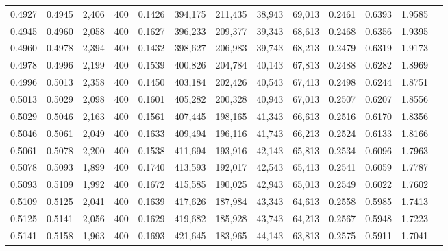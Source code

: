 \begin{tabular}{rrrrrrrrrrrrr}
0.4927 & 0.4945 &  2,406 & 400 &                                     0.1426 & 394,175 & 211,435 &  38,943 &  69,013 & 0.2461 & 0.6393 & 1.9585 \\
0.4945 & 0.4960 &  2,058 & 400 &                                     0.1627 & 396,233 & 209,377 &  39,343 &  68,613 & 0.2468 & 0.6356 & 1.9395 \\
0.4960 & 0.4978 &  2,394 & 400 &                                     0.1432 & 398,627 & 206,983 &  39,743 &  68,213 & 0.2479 & 0.6319 & 1.9173 \\
0.4978 & 0.4996 &  2,199 & 400 &                                     0.1539 & 400,826 & 204,784 &  40,143 &  67,813 & 0.2488 & 0.6282 & 1.8969 \\
0.4996 & 0.5013 &  2,358 & 400 &                                     0.1450 & 403,184 & 202,426 &  40,543 &  67,413 & 0.2498 & 0.6244 & 1.8751 \\
0.5013 & 0.5029 &  2,098 & 400 &                                     0.1601 & 405,282 & 200,328 &  40,943 &  67,013 & 0.2507 & 0.6207 & 1.8556 \\
0.5029 & 0.5046 &  2,163 & 400 &                                     0.1561 & 407,445 & 198,165 &  41,343 &  66,613 & 0.2516 & 0.6170 & 1.8356 \\
0.5046 & 0.5061 &  2,049 & 400 &                                     0.1633 & 409,494 & 196,116 &  41,743 &  66,213 & 0.2524 & 0.6133 & 1.8166 \\
0.5061 & 0.5078 &  2,200 & 400 &                                     0.1538 & 411,694 & 193,916 &  42,143 &  65,813 & 0.2534 & 0.6096 & 1.7963 \\
0.5078 & 0.5093 &  1,899 & 400 &                                     0.1740 & 413,593 & 192,017 &  42,543 &  65,413 & 0.2541 & 0.6059 & 1.7787 \\
0.5093 & 0.5109 &  1,992 & 400 &                                     0.1672 & 415,585 & 190,025 &  42,943 &  65,013 & 0.2549 & 0.6022 & 1.7602 \\
0.5109 & 0.5125 &  2,041 & 400 &                                     0.1639 & 417,626 & 187,984 &  43,343 &  64,613 & 0.2558 & 0.5985 & 1.7413 \\
0.5125 & 0.5141 &  2,056 & 400 &                                     0.1629 & 419,682 & 185,928 &  43,743 &  64,213 & 0.2567 & 0.5948 & 1.7223 \\
0.5141 & 0.5158 &  1,963 & 400 &                                     0.1693 & 421,645 & 183,965 &  44,143 &  63,813 & 0.2575 & 0.5911 & 1.7041 \\

\end{tabular}
